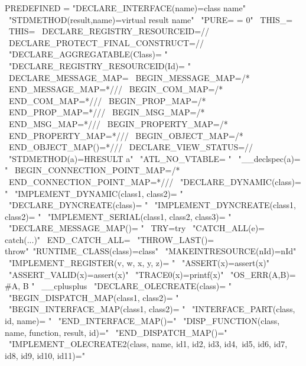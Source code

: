 \begin{DoxyVerb}PREDEFINED           = "DECLARE_INTERFACE(name)=class name" \
                       "STDMETHOD(result,name)=virtual result name" \
                       "PURE= = 0" \
                       THIS_= \
                       THIS= \
                       DECLARE_REGISTRY_RESOURCEID=// \
                       DECLARE_PROTECT_FINAL_CONSTRUCT=// \
                       "DECLARE_AGGREGATABLE(Class)= " \
                       "DECLARE_REGISTRY_RESOURCEID(Id)= " \
                       DECLARE_MESSAGE_MAP= \
                       BEGIN_MESSAGE_MAP=/* \
                       END_MESSAGE_MAP=*/// \
                       BEGIN_COM_MAP=/* \
                       END_COM_MAP=*/// \
                       BEGIN_PROP_MAP=/* \
                       END_PROP_MAP=*/// \
                       BEGIN_MSG_MAP=/* \
                       END_MSG_MAP=*/// \
                       BEGIN_PROPERTY_MAP=/* \
                       END_PROPERTY_MAP=*/// \
                       BEGIN_OBJECT_MAP=/* \
                       END_OBJECT_MAP()=*/// \
                       DECLARE_VIEW_STATUS=// \
                       "STDMETHOD(a)=HRESULT a" \
                       "ATL_NO_VTABLE= " \
                       "__declspec(a)= " \
                       BEGIN_CONNECTION_POINT_MAP=/* \
                       END_CONNECTION_POINT_MAP=*/// \
                       "DECLARE_DYNAMIC(class)= " \
                       "IMPLEMENT_DYNAMIC(class1, class2)= " \
                       "DECLARE_DYNCREATE(class)= " \
                       "IMPLEMENT_DYNCREATE(class1, class2)= " \
                       "IMPLEMENT_SERIAL(class1, class2, class3)= " \
                       "DECLARE_MESSAGE_MAP()= " \
                       TRY=try \
                       "CATCH_ALL(e)= catch(...)" \
                       END_CATCH_ALL= \
                       "THROW_LAST()= throw"\
                       "RUNTIME_CLASS(class)=class" \
                       "MAKEINTRESOURCE(nId)=nId" \
                       "IMPLEMENT_REGISTER(v, w, x, y, z)= " \
                       "ASSERT(x)=assert(x)" \
                       "ASSERT_VALID(x)=assert(x)" \
                       "TRACE0(x)=printf(x)" \
                       "OS_ERR(A,B)={ #A, B }" \
                       __cplusplus \
                       "DECLARE_OLECREATE(class)= " \
                       "BEGIN_DISPATCH_MAP(class1, class2)= " \
                       "BEGIN_INTERFACE_MAP(class1, class2)= " \
                       "INTERFACE_PART(class, id, name)= " \
                       "END_INTERFACE_MAP()=" \
                       "DISP_FUNCTION(class, name, function, result, id)=" \
                       "END_DISPATCH_MAP()=" \
                       "IMPLEMENT_OLECREATE2(class, name, id1, id2, id3, id4,\
                        id5, id6, id7, id8, id9, id10, id11)="
\end{DoxyVerb}



